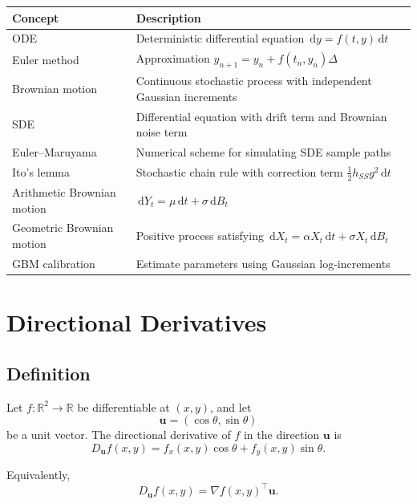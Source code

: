 \documentclass[12pt,oneside]{book}
\numberwithin{equation}{section}
\theoremstyle{definition}
\theoremstyle{plain}
\theoremstyle{remark}
\newcommand{\R}{\mathbb{R}}
\newcommand{\dd}{\,\mathrm{d}}
\newcommand{\grad}{\nabla}
\begin{document}
\begin{center}
\begin{xltabular}{\textwidth}{>{\raggedright\arraybackslash}p{0.28\textwidth}
>{\raggedright\arraybackslash}X}
\toprule
Concept & Description \\
\midrule
ODE
& Deterministic differential equation $\dd y=f(t,y)\dd t$ \\

Euler method
& Approximation $y_{n+1}=y_n+f(t_n,y_n)\Delta$ \\

Brownian motion
& Continuous stochastic process with independent Gaussian increments \\

SDE
& Differential equation with drift term and Brownian noise term \\

Euler--Maruyama
& Numerical scheme for simulating SDE sample paths \\

Ito's lemma
& Stochastic chain rule with correction term $\frac{1}{2}h_{SS}g^2\dd t$ \\

Arithmetic Brownian motion
& $\dd Y_t=\mu\dd t+\sigma\dd B_t$ \\

Geometric Brownian motion
& Positive process satisfying $\dd X_t=\alpha X_t\dd t+\sigma X_t\dd B_t$ \\

GBM calibration
& Estimate parameters using Gaussian log-increments \\
\bottomrule
\end{xltabular}
\end{center}

\chapter{Directional Derivatives}

\section{Definition}

Let $f:\R^2\to\R$ be differentiable at $(x,y)$, and let
\[
\mathbf{u}=(\cos\theta,\sin\theta)
\]
be a unit vector. The directional derivative of $f$ in the direction $\mathbf{u}$ is
\[
D_{\mathbf{u}}f(x,y)
=
f_x(x,y)\cos\theta+f_y(x,y)\sin\theta.
\]

Equivalently,
\[
D_{\mathbf{u}}f(x,y)
=
\grad f(x,y)^\top \mathbf{u}.
\]
\end{document}
